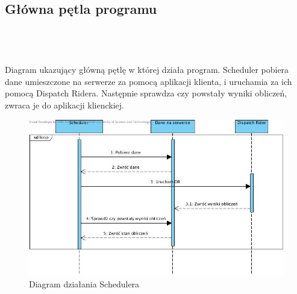 \subsection{Główna pętla programu}\\\\
\\Diagram ukazujący główną pętlę w której działa program. Scheduler pobiera dane umieszczone na serwerze za pomocą aplikacji klienta, i uruchamia za ich pomocą Dispatch Ridera. Następnie sprawdza czy powstały wyniki obliczeń, zwraca je do aplikacji klienckiej.
\begin{center}
\begin{figure}[H]
\centering
\includegraphics[scale=0.7]{imgs/S1.jpg}
\caption{Diagram działania Schedulera}
\label{fig:tasks_list}
\end{figure}
\end{center}